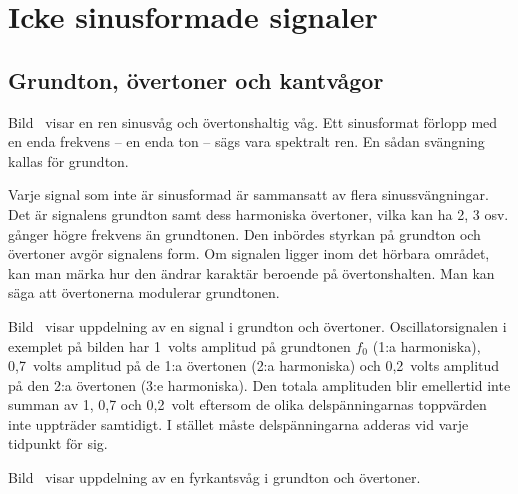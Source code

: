 \newpage
\section{Icke sinusformade signaler}

\subsection{Grundton, övertoner och kantvågor}
\label{subsec:oevertoner}


Bild~ visar en ren sinusvåg och övertonshaltig våg.
Ett sinusformat förlopp med en enda frekvens -- en enda ton -- sägs vara
spektralt ren.
En sådan svängning kallas för grundton.

Varje signal som inte är sinusformad är sammansatt av flera sinussvängningar.
Det är signalens grundton samt dess harmoniska övertoner, vilka kan ha 2, 3
osv. gånger högre frekvens än grundtonen.
Den inbördes styrkan på grundton och övertoner avgör signalens form.
Om signalen ligger inom det hörbara området, kan man märka hur den ändrar
karaktär beroende på övertonshalten.
Man kan säga att övertonerna modulerar grundtonen.


Bild~ visar uppdelning av en signal i grundton och
övertoner.
Oscillatorsignalen i exemplet på bilden har 1~volts amplitud på grundtonen
\(f_0\) (1:a harmoniska), 0,7~volts amplitud på de 1:a övertonen
(2:a harmoniska) och 0,2~volts amplitud på den 2:a övertonen (3:e harmoniska).
Den totala amplituden blir emellertid inte summan av 1, 0,7 och 0,2~volt
eftersom de olika delspänningarnas toppvärden inte uppträder samtidigt.
I stället måste delspänningarna adderas vid varje tidpunkt för sig.


Bild~ visar uppdelning av en fyrkantsvåg i grundton och
övertoner.

